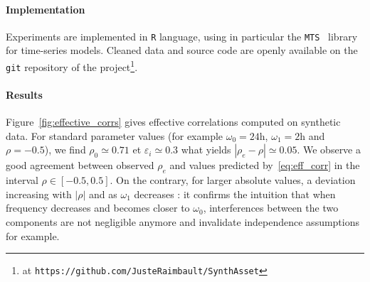 

\paragraph{Implementation}

Experiments are implemented in \texttt{R} language, using in particular the \texttt{MTS}~\cite{Tsay:2015xy} library for time-series models. Cleaned data and source code are openly available on the \texttt{git} repository of the project\footnote{at \texttt{https://github.com/JusteRaimbault/SynthAsset}}. 



\paragraph{Results}



Figure~\ref{fig:effective_corrs} gives effective correlations computed on synthetic data. For standard parameter values (for example $\omega_0=24\textrm{h}$, $\omega_1=2\textrm{h}$ and $\rho=-0.5$), we find $\rho_0\simeq 0.71$ et $\varepsilon_i \simeq 0.3$ what yields $\left| \rho_e - \rho \right|\simeq 0.05$. We observe a good agreement between observed $\rho_e$ and values predicted by~\ref{eq:eff_corr} in the interval $\rho \in [-0.5,0.5]$. On the contrary, for larger absolute values, a deviation increasing with $\left|\rho\right|$ and as $\omega_1$ decreases : it confirms the intuition that when frequency decreases and becomes closer to $\omega_0$, interferences between the two components are not negligible anymore and invalidate independence assumptions for example. 


